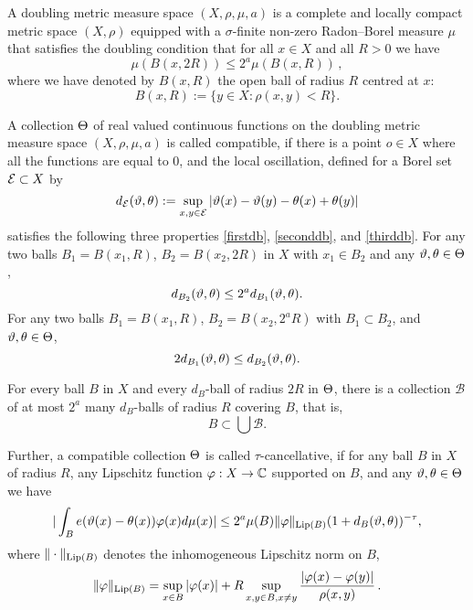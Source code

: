 A doubling metric measure space  $(X,\rho,\mu, a)$ is a complete
and locally compact metric space $(X,\rho)$
equipped with a $\sigma$-finite non-zero Radon--Borel measure $\mu$ that satisfies the doubling condition that for all $x\in X$ and all $R>0$ we have
\begin{equation}\label{doublingx}
    \mu(B(x,2R))\le 2^a\mu(B(x,R))\,,
\end{equation}
where we have denoted by $B(x,R)$ the open ball of radius $R$ centred at $x$:
\begin{equation}\label{eq define ball}
    B(x,R):=\{y\in X: \rho(x,y)<R\}. \end{equation}


A  collection $\Theta$ of real valued continuous functions on the doubling metric measure space $(X,\rho,\mu,a)$ is called compatible, if there is a point $o\in X$ where all the functions are equal to $0$, and the  local oscillation, defined for a Borel set $\mathcal{E}\subset X$ by
\begin{equation}\label{definedE}
    d_{\mathcal{E}}(\vartheta,\theta):=\sup_{x,y\in \mathcal{E}}|\vartheta(x)-{\vartheta(y)}- \theta(x)+{\theta(y)}|
\end{equation}
satisfies the following three properties
\eqref{firstdb}, \eqref{seconddb}, and \eqref{thirddb}.
For any two balls $B_1=B(x_1,R)$, $B_2= B(x_2,2R)$ in $X$ with $x_1\in B_2$  and any $\vartheta,\theta\in \Theta$,
\begin{equation}\label{firstdb}
    d_{B_2}(\vartheta,\theta)\le 2^a d_{B_1}(\vartheta,\theta) .
\end{equation}
For any two balls
$B_1=B(x_1,R)$, $B_2= B(x_2,2^aR)$
with $B_1\subset B_2$, and $\vartheta,\theta\in \Theta$,
\begin{equation}\label{seconddb}
    2d_{B_1}(\vartheta,\theta)
\le d_{B_2}(\vartheta,\theta) .
\end{equation}



For every ball $B$ in $X$ and
every $d_B$-ball of radius $2R$ in $\Theta$, there is a collection $\mathcal{B}$ of
at most $2^a$ many  $d_B$-balls of radius $R$ covering $B$, that is,
\begin{equation}\label{thirddb}
    B\subset \bigcup \mathcal{B}.
\end{equation}


Further, a compatible collection $\Theta$ is called $\tau$-cancellative, if
for any ball $B$ in $X$ of radius $R$, any Lipschitz function $\varphi: X\to \mathbb{C}$
supported on $B$, and any $\vartheta,\theta\in \Theta$ we have
\begin{equation}
    \label{eq vdc cond}
    |\int_B e(\vartheta(x)-{\theta(x)}) \varphi(x) d\mu(x)|\le 2^a  \mu(B)\|\varphi\|_{\operatorname{\operatorname{Lip}}(B)}
(1+d_B(\vartheta,\theta))^{-\tau},
\end{equation}
where $\|\cdot\|_{\operatorname{\operatorname{Lip}}(B)}$ denotes the inhomogeneous Lipschitz norm on $B$,
$$
    \|\varphi\|_{\operatorname{\operatorname{Lip}}(B)} = \sup_{x \in B} |\varphi(x)| + R \sup_{x,y \in B, x \neq y} \frac{|\varphi(x) - \varphi(y)|}{\rho(x,y)}\,.
$$




